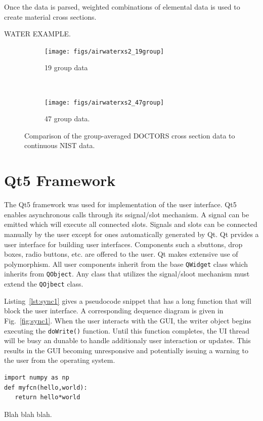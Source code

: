 Once the data is parsed, weighted combinations of elemental data is used to create material cross sections.

WATER EXAMPLE.

\begin{figure}
    \centering
    \begin{subfigure}[b]{0.45\textwidth}
        \texttt{[image: figs/airwaterxs2\_19group]}
        \caption{19 group data}
        \label{fig:airwaterxs2_19group}
    \end{subfigure}
    ~
    \begin{subfigure}[b]{0.45\textwidth}
        \texttt{[image: figs/airwaterxs2\_47group]}
        \caption{47 group data.}
        \label{fig:airwaterxs2_47group}
    \end{subfigure}
    \caption{Comparison of the group-averaged DOCTORS cross section data to continuous NIST data.}\label{fig:airwaterxs_group}
\end{figure}

\section{Qt5 Framework}\label{sec:qt}
The Qt5 framework was used for implementation of the user interface. Qt5 enables asynchronous calls through its ssignal/slot mechanism. A signal can be emitted which will execute all connected slots. Signals and slots can be connected manually by the user except for ones automatically generated by Qt. Qt prvides a user interface for building user interfaces. Components such a sbuttons, drop boxes, radio buttons, etc. are offered to the user. Qt makes extensive use of polymorphism. All user components inherit from the base \texttt{QWidget} class which inherits from \texttt{QObject}. Any class that utilizes the signal/sloot mechanism must extend the \texttt{QOjbect} class.

Listing~\ref{lst:sync1} gives a pseudocode snippet that has a long function that will block the user interface. A corresponding dequence diagram is given in Fig.~\ref{fig:sync1}. When the user interacts with the GUI, the writer object begins executing the \texttt{doWrite()} function. Until this function completes, the UI thread will be busy an dunable to handle additionaly user interaction or updates. This results in the GUI becoming unresponsive and potentially issuing a warning to the user from the operating system.

\begin{listing}
\begin{verbatim}
import numpy as np
def myfcn(hello,world):
   return hello*world
\end{verbatim}
\caption{Blah blah blah.}\label{lst:sync1}
\end{listing}

